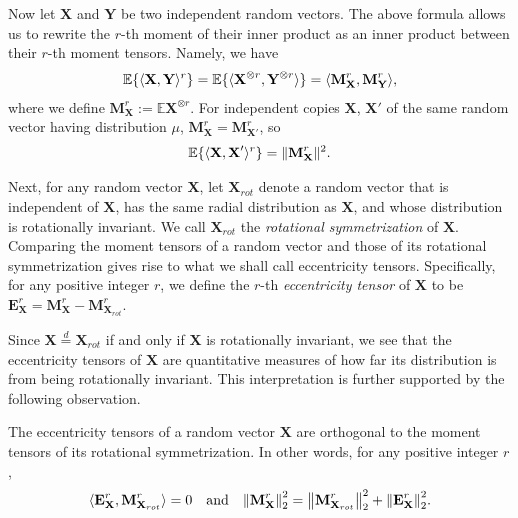 \documentclass[final,12pt]{colt2018} %
\numberwithin{equation}{section}
\DeclarePairedDelimiter{\norm}{\lVert}{\rVert}
\DeclarePairedDelimiter{\braces}{\lbrace}{\rbrace}
\DeclarePairedDelimiter{\inprod}{\langle}{\rangle}
\newcommand{\E}{\mathbb{E}}
\newcommand{\boldX}{\textbf{X}}
\newcommand{\boldY}{\textbf{Y}}
\newcommand{\boldM}{\textbf{M}}
\newcommand{\tensor}{\otimes}
\begin{document}
Now let $\boldX$ and $\boldY$ be two independent random vectors. The above formula allows us to rewrite the $r$-th moment of their inner product as an inner product between their $r$-th moment tensors. Namely, we have
\begin{align} \label{tensorid1}
\E\braces{\inprod{\boldX,\boldY}^r} = \E\braces{\inprod{\boldX^{\tensor r},\boldY^{\tensor r}}} = \inprod*{\boldM^r_\boldX,\boldM^r_\boldY},
\end{align}
where we define $\boldM^r_\boldX := \E \boldX^{\tensor r}$.
For independent copies $\boldX$, $\boldX'$ of the same random vector having distribution $\mu$, $\boldM^r_\boldX = \boldM^r_{\boldX'}$, so
\begin{align} \label{tensorid2}
\E\braces{\inprod{\boldX,\boldX'}^r} = \norm{\boldM^r_\boldX}^2.
\end{align}

Next, for any random vector $\boldX$, let $\boldX_{rot}$ denote a random vector that is independent of $\boldX$, has the same radial distribution as $\boldX$, and whose distribution is rotationally invariant. We call $\boldX_{rot}$ the \emph{rotational symmetrization} of $\boldX$. Comparing the moment tensors of a random vector and those of its rotational symmetrization gives rise to what we shall call eccentricity tensors. Specifically, for any positive integer $r$, we define the $r$-th \emph{eccentricity tensor} of $\boldX$ to be $\textbf{E}^r_\boldX = \boldM^r_\boldX - \boldM^r_{\boldX_{rot}}$.

Since $\boldX \stackrel{d}{=} \boldX_{rot}$ if and only if $\boldX$ is rotationally invariant, we see that the eccentricity tensors of $\boldX$ are quantitative measures of how far its distribution is from being rotationally invariant. This interpretation is further supported by the following observation.

\begin{lemma}[Orthogonality]
	The eccentricity tensors of a random vector $\boldX$ are orthogonal to the moment tensors of its rotational symmetrization. In other words, for any positive integer $r$,
	\begin{align} \label{eq: orthogonality}
	\inprod{\textbf{E}^r_\boldX, \boldM^r_{\boldX_{rot}}} = 0
	\quad \text{and} \quad
	\norm*{\boldM^r_\boldX}_2^2 = \norm*{\boldM^r_{\boldX_{rot}}}_2^2 + \norm*{\textbf{E}^r_\boldX}_2^2.
	\end{align}
\end{lemma}
\end{document}
